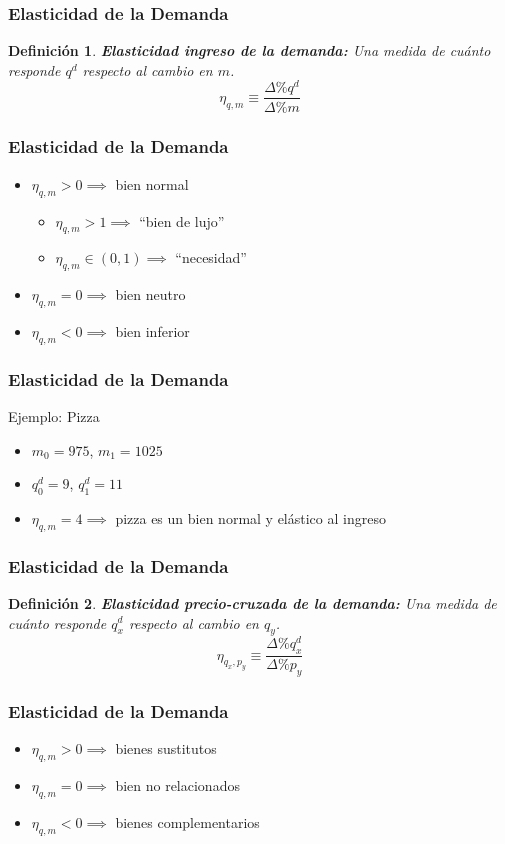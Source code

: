\documentclass{beamer}
\newtheorem{mydef}{Definición}
\newcommand{\peq}[1]{{\scriptscriptstyle{#1}}}
\newcommand{\rp}[1]{\left(#1\right)}
\begin{document}
		\begin{frame}
			\frametitle{Elasticidad de la Demanda}
			\begin{mydef}
				\textbf{Elasticidad ingreso de la demanda:} Una medida de cuánto responde $q^\peq{d}$ respecto al cambio en $m$. $$\eta_\peq{q,m}\equiv\frac{\Delta\%q^\peq{d}}{\Delta\%m}$$
			\end{mydef}
		\end{frame}

\begin{frame}
			\frametitle{Elasticidad de la Demanda}
			\begin{itemize}
				\item $\eta_\peq{q,m}>0\implies$ bien normal
					\begin{itemize}
						\item $\eta_\peq{q,m}>1\implies$ ``bien de lujo''
						\item $\eta_\peq{q,m}\in\rp{0,1}\implies$ ``necesidad''
					\end{itemize}
				\item $\eta_\peq{q,m}=0\implies$ bien neutro
				\item $\eta_\peq{q,m}<0\implies$ bien inferior
			\end{itemize}
		\end{frame}
		
		\begin{frame}
			\frametitle{Elasticidad de la Demanda}
			Ejemplo: Pizza
			\begin{itemize}
				\item $m_\peq{0}=975$, $m_\peq{1}=1025$
				\item $q^\peq{d}_\peq{0}=9$, $q^\peq{d}_\peq{1}=11$
				\item $\eta_\peq{q,m}=4\implies$ pizza es un bien normal y elástico al ingreso
			\end{itemize}
		\end{frame}		

		\begin{frame}
			\frametitle{Elasticidad de la Demanda}
			\begin{mydef}
				\textbf{Elasticidad precio-cruzada de la demanda:} Una medida de cuánto responde $q^\peq{d}_\peq{x}$ respecto al cambio en $q_\peq{y}$. $$\eta_\peq{q_\peq{x},p_\peq{y}}\equiv\frac{\Delta\%q^\peq{d}_\peq{x}}{\Delta\%p_\peq{y}}$$
			\end{mydef}
		\end{frame}

\begin{frame}
			\frametitle{Elasticidad de la Demanda}
			\begin{itemize}
				\item $\eta_\peq{q,m}>0\implies$ bienes sustitutos
				\item $\eta_\peq{q,m}=0\implies$ bien no relacionados
				\item $\eta_\peq{q,m}<0\implies$ bienes complementarios
			\end{itemize}
		\end{frame}
		
\end{document}
